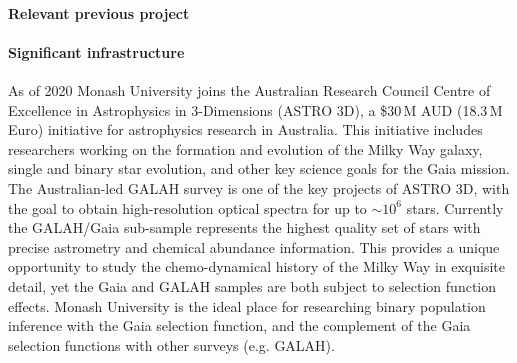 \paragraph{Relevant previous project}

\paragraph{Significant infrastructure}
As of 2020 Monash University joins the Australian Research Council Centre of Excellence in Astrophysics in 3-Dimensions (ASTRO 3D), a \$30\,M AUD (18.3\,M Euro) initiative for astrophysics research in Australia. This initiative includes researchers working on the formation and evolution of the Milky Way galaxy, single and binary star evolution, and other key science goals for the Gaia mission. The Australian-led GALAH survey is one of the key projects of ASTRO 3D, with the goal to obtain high-resolution optical spectra for up to $\sim10^6$ stars. Currently the GALAH/Gaia sub-sample represents the highest quality set of stars with precise astrometry and chemical abundance information. This provides a unique opportunity to study the chemo-dynamical history of the Milky Way in exquisite detail, yet the Gaia and GALAH samples are both subject to selection function effects. Monash University is the ideal place for researching binary population inference with the Gaia selection function, and the complement of the Gaia selection functions with other surveys (e.g. GALAH).
